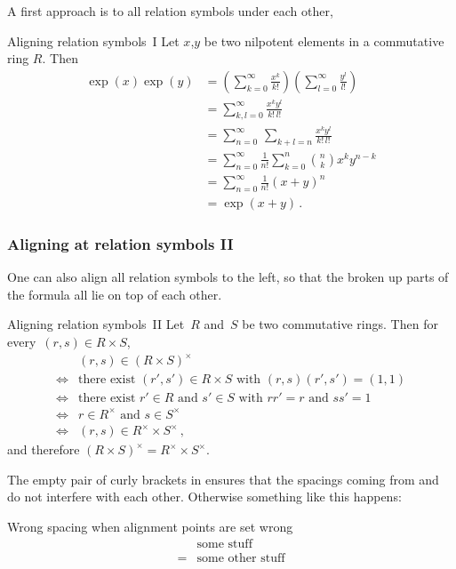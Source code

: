 A first approach is to all relation symbols under each other, 
\begin{showlatex}{Aligning relation symbols~I}
Let $x$,$y$ be two nilpotent elements in a commutative ring $R$.
Then
\begin{align*}
  \exp(x) \exp(y)
  &=
  \left( \sum_{k=0}^\infty \frac{x^k}{k!} \right)
  \left( \sum_{l=0}^\infty \frac{y^l}{l!} \right)
  \\
  &=
  \sum_{k,l=0}^\infty \frac{x^k y^l}{k! \, l!}
  \\
  &=
  \sum_{n=0}^\infty \, \sum_{k+l = n} \frac{x^k y^l}{k! \, l!}
  \\
  &=
  \sum_{n=0}^\infty \frac{1}{n!} \sum_{k=0}^n \binom{n}{k} x^k y^{n-k}
  \\
  &=
  \sum_{n=0}^\infty \frac{1}{n!} (x + y)^n
  \\
  &=
  \exp(x + y) \,.
\end{align*}
\end{showlatex}

\subsubsection{Aligning at relation symbols II}

One can also align all relation symbols to the left, so that the broken up parts of the formula all lie on top of each other.
\begin{showlatex}{Aligning relation symbols~II}
Let~$R$ and~$S$ be two commutative rings.
Then for every~$(r,s) \in R \times S$,
\begin{align*}
  {}&
  (r, s) \in (R \times S)^\times
  \\
  \iff{}&
  \text{there exist $(r', s') \in R \times S$ with $(r,s)(r',s') = (1,1)$}
  \\
  \iff{}&
  \text{there exist $r' \in R$ and $s' \in S$ with $rr' = r$ and $ss' = 1$}
  \\
  \iff{}&
  \text{$r \in R^\times$ and $s \in S^\times$}
  \\
  \iff{}&
  (r,s) \in R^\times \times S^\times \,,
\end{align*}
and therefore $(R \times S)^{\times} = R^\times \times S^\times$.
\end{showlatex}
The empty pair of curly brackets in  ensures that the spacings coming from  and~\inlinecode{\&} do not interfere with each other.
Otherwise something like this happens:
\begin{showlatex}{Wrong spacing when alignment points are set wrong}
  \begin{align*}
     &\text{some stuff} \\
    =&\text{some other stuff}
  \end{align*}
\end{showlatex}

